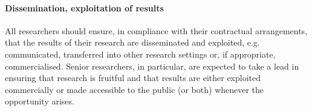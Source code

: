 \paragraph{Dissemination, exploitation of results}
All researchers should ensure, in compliance with their contractual arrangements, that the results of their research are disseminated and exploited, e.g. communicated, transferred into other research settings or, if appropriate, commercialised. Senior researchers, in particular, are expected to take a lead in ensuring that research is fruitful and that results are either exploited commercially or made accessible to the public (or both) whenever the opportunity arises. 
